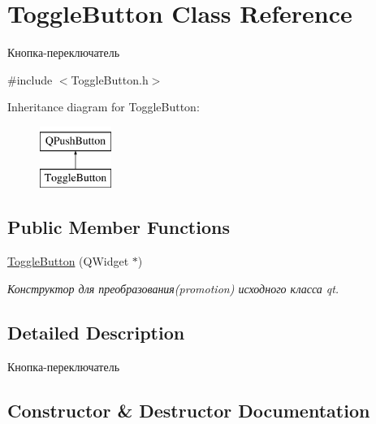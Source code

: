 \hypertarget{class_toggle_button}{}\section{Toggle\+Button Class Reference}
\label{class_toggle_button}


Кнопка-\/переключатель  




{\ttfamily \#include $<$Toggle\+Button.\+h$>$}

Inheritance diagram for Toggle\+Button\+:\begin{figure}[H]
\begin{center}
\leavevmode
\includegraphics[height=2.000000cm]{class_toggle_button}
\end{center}
\end{figure}
\subsection*{Public Member Functions}
\begin{DoxyCompactItemize}
\item 
\mbox{\hyperlink{class_toggle_button_abf137e4fb0e825ae60e01dc0056f4224}{Toggle\+Button}} (Q\+Widget $\ast$)
\begin{DoxyCompactList}\small\item\em Конструктор для преобразования(promotion) исходного класса qt. \end{DoxyCompactList}\end{DoxyCompactItemize}


\subsection{Detailed Description}
Кнопка-\/переключатель 

\subsection{Constructor \& Destructor Documentation}
\mbox{\label{class_toggle_button_abf137e4fb0e825ae60e01dc0056f4224}} 
